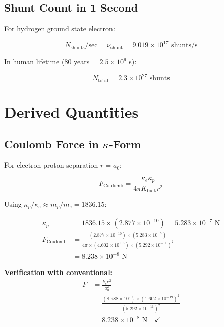\documentclass{article}
\begin{document}
\subsection{Shunt Count in 1 Second}

For hydrogen ground state electron:

\begin{equation}
N_{\text{shunts}}/\text{sec} = \nu_{\text{shunt}} = 9.019 \times 10^{17} \text{ shunts/s}
\end{equation}

In human lifetime (80 years = $2.5 \times 10^9$ s):

\begin{equation}
N_{\text{total}} = 2.3 \times 10^{27} \text{ shunts}
\end{equation}

\section{Derived Quantities}

\subsection{Coulomb Force in $\kappa$-Form}

For electron-proton separation $r = a_0$:

\begin{equation}
F_{\text{Coulomb}} = \frac{\kappa_e \kappa_p}{4\pi K_{\text{bulk}} r^2}
\end{equation}

Using $\kappa_p/\kappa_e \approx m_p/m_e = 1836.15$:

\begin{align}
\kappa_p &= 1836.15 \times (2.877 \times 10^{-10}) = 5.283 \times 10^{-7} \text{ N} \\
F_{\text{Coulomb}} &= \frac{(2.877 \times 10^{-10}) \times (5.283 \times 10^{-7})}{4\pi \times (4.602 \times 10^{113}) \times (5.292 \times 10^{-11})^2} \\
&= 8.238 \times 10^{-8} \text{ N}
\end{align}

\textbf{Verification with conventional:}
\begin{align}
F &= \frac{k_e e^2}{a_0^2} \\
&= \frac{(8.988 \times 10^9) \times (1.602 \times 10^{-19})^2}{(5.292 \times 10^{-11})^2} \\
&= 8.238 \times 10^{-8} \text{ N} \quad \checkmark
\end{align}
\end{document}
